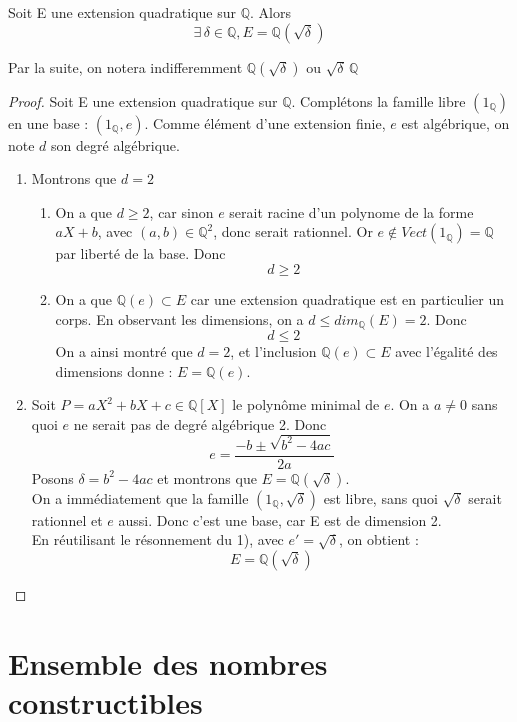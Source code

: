 \documentclass[a4paper,12pt,french,draft]{report}
\begin{document}
		\begin{proposition}
			Soit E une extension quadratique sur $\mathbb{Q}$. Alors
			\[{}
				\exists\, \delta \in \mathbb{Q}, E = \mathbb{Q}(\sqrt{\delta})
			\]
		\end{proposition}
		 Par la suite, on notera indifferemment $\mathbb{Q}(\sqrt{\delta})$ ou $\sqrt{\delta}\,\mathbb{Q}$
		\begin{proof}
			Soit E une extension quadratique sur $\mathbb{Q}$. Complétons la famille libre $(1_{\mathbb{Q}})$ en une base : $(1_{\mathbb{Q}},e)$. Comme élément d'une extension finie, $e$ est algébrique, on note $d$ son degré algébrique.
			\begin{enumerate}
				\item  Montrons que $d = 2$
				\begin{enumerate}
				    \item On a que $d\geq2$, car sinon $e$ serait racine d'un polynome de la forme $aX +b$, avec $(a,b) \in \mathbb{Q}^{2}$, donc serait rationnel. Or  $e \notin Vect(1_{\mathbb{Q}}) = \mathbb{Q}$ par liberté de la base. Donc \[d\geq 2\]
				    \item On a que $\mathbb{Q}(e) \subset E $ car une extension quadratique est en particulier un corps. En observant les dimensions, on a $d \leq dim_{\mathbb{Q}}(E) = 2$. Donc 
				    \[d \leq 2\] On a ainsi montré que $d=2$, et l'inclusion $\mathbb{Q}(e) \subset E $ avec l'égalité des dimensions donne : $E = \mathbb{Q}(e)$.
				\end{enumerate}
				
				\item  Soit $P = aX^{2} + bX +c \in \mathbb{Q}[X]$ le polynôme minimal de $e$. On a $a\neq 0$ sans quoi $e$ ne serait pas de degré algébrique 2. Donc \[e = \frac{-b \pm \sqrt{b^{2} - 4ac}}{2a}\]
				Posons $\delta = b^{2} - 4ac$ et montrons que $E = \mathbb{Q}(\sqrt{\delta})$.\\
				On a immédiatement que la famille \((1_{\mathbb{Q}},\sqrt{\delta})\) est libre, sans quoi $\sqrt{\delta}$ serait rationnel et $e$ aussi. Donc c'est une base, car E est de dimension 2.\\
				En réutilisant le résonnement du 1), avec $e' = \sqrt{\delta}$, on obtient : \[E = \mathbb{Q}(\sqrt{\delta})\]
				    
				    
			\end{enumerate}
		\end{proof}
		
		
		
		\section{Ensemble des nombres constructibles}
		
\end{document}
